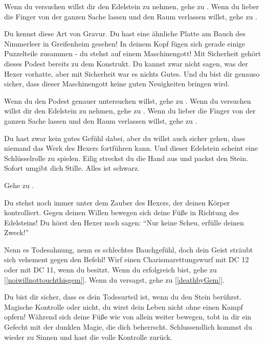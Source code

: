 Wenn du versuchen willst dir den Edelstein zu nehmen, gehe zu .
Wenn du lieber die Finger von der ganzen Sache lassen und den Raum verlassen willst, gehe zu .


Du kennst diese Art von Gravur. Du hast eine ähnliche Platte am Bauch des Nimmerleer in Greifenheim gesehen! In deinem Kopf fügen sich gerade einige Puzzelteile zusammen - du stehst auf einem Maschinengott! Mit Sicherheit gehört dieses Podest bereits zu dem Konstrukt. Du kannst zwar nicht sagen, was der Hexer vorhatte, aber mit Sicherheit war es nichts Gutes. Und du bist dir genauso sicher, dass dieser Maschinengott keine guten Neuigkeiten bringen wird.

Wenn du den Podest genauer untersuchen willst, gehe zu .
Wenn du versuchen willst dir den Edelstein zu nehmen, gehe zu .
Wenn du lieber die Finger von der ganzen Sache lassen und den Raum verlassen willst, gehe zu .


Du hast zwar kein gutes Gefühl dabei, aber du willst auch sicher gehen, dass niemand das Werk des Hexers fortführen kann. Und dieser Edelstein scheint eine Schlüsselrolle zu spielen. Eilig streckst du die Hand aus und packst den Stein. Sofort umgibt dich Stille. Alles ist schwarz.

Gehe zu .


Du stehst noch immer unter dem Zauber des Hexers, der deinen Körper kontrolliert. Gegen deinen Willen bewegen sich deine Füße in Richtung des Edelsteins! Du hörst den Hexer noch sagen: ``Nur keine Scheu, erfülle deinen Zweck!''

Nenn es Todesahnung, nenn es schlechtes Bauchgefühl, doch dein Geist sträubt sich vehement gegen den Befehl! Wirf einen Charismarettungswurf mit DC 12 oder mit DC 11, wenn du  besitzt. Wenn du erfolgreich bist, gehe zu [\ref{noiwillnottouchthisgem}]. Wenn du versagst, gehe zu [\ref{deathbyGem}].


Du bist dir sicher, dass es dein Todesurteil ist, wenn du den Stein berührst. Magische Kontrolle oder nicht, du wirst dein Leben nicht ohne einen Kampf opfern! Während sich deine Füße wie von allein weiter bewegen, tobt in dir ein Gefecht mit der dunklen Magie, die dich beherrscht. Schlussendlich kommst du wieder zu Sinnen und hast die volle Kontrolle zurück.

